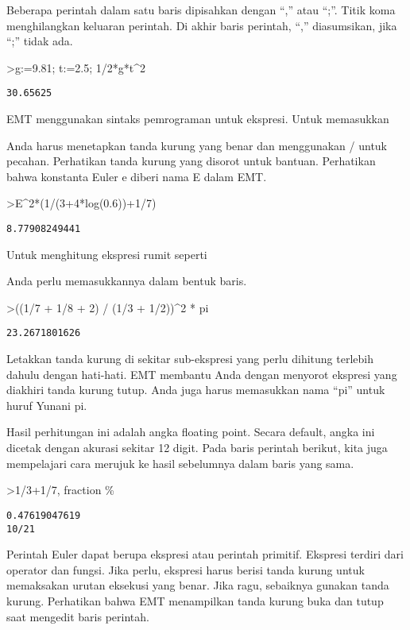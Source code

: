 \documentclass[
]{book}
\begin{document}
Beberapa perintah dalam satu baris dipisahkan dengan ``,'' atau ``;''. Titik koma menghilangkan keluaran perintah. Di akhir baris perintah, ``,'' diasumsikan, jika ``;'' tidak ada.

\textgreater g:=9.81; t:=2.5; 1/2*g*t\^{}2

\begin{verbatim}
30.65625
\end{verbatim}

EMT menggunakan sintaks pemrograman untuk ekspresi. Untuk memasukkan

Anda harus menetapkan tanda kurung yang benar dan menggunakan / untuk pecahan. Perhatikan tanda kurung yang disorot untuk bantuan. Perhatikan bahwa konstanta Euler e diberi nama E dalam EMT.

\textgreater E\^{}2*(1/(3+4*log(0.6))+1/7)

\begin{verbatim}
8.77908249441
\end{verbatim}

Untuk menghitung ekspresi rumit seperti

Anda perlu memasukkannya dalam bentuk baris.

\textgreater((1/7 + 1/8 + 2) / (1/3 + 1/2))\^{}2 * pi

\begin{verbatim}
23.2671801626
\end{verbatim}

Letakkan tanda kurung di sekitar sub-ekspresi yang perlu dihitung terlebih dahulu dengan hati-hati. EMT membantu Anda dengan menyorot ekspresi yang diakhiri tanda kurung tutup. Anda juga harus memasukkan nama ``pi'' untuk huruf Yunani pi.

Hasil perhitungan ini adalah angka floating point. Secara default, angka ini dicetak dengan akurasi sekitar 12 digit. Pada baris perintah berikut, kita juga mempelajari cara merujuk ke hasil sebelumnya dalam baris yang sama.

\textgreater1/3+1/7, fraction \%

\begin{verbatim}
0.47619047619
10/21
\end{verbatim}

Perintah Euler dapat berupa ekspresi atau perintah primitif. Ekspresi terdiri dari operator dan fungsi. Jika perlu, ekspresi harus berisi tanda kurung untuk memaksakan urutan eksekusi yang benar. Jika ragu, sebaiknya gunakan tanda kurung. Perhatikan bahwa EMT menampilkan tanda kurung buka dan tutup saat mengedit baris perintah.
\end{document}
